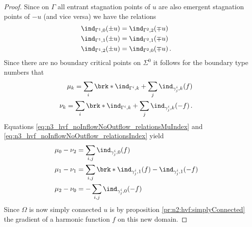 \begin{proof}
  Since on $\Gamma$ all entrant stagnation points of $u$ are also emergent
  stagnation points of $-u$ (and vice versa) we have the relations
  \begin{equation}
    \begin{aligned}
    \ind_{\Gamma^1,0}(\pm u)&=\ind_{\Gamma^2,2}(\mp u) \\
    \ind_{\Gamma^1,1}(\pm u)&=\ind_{\Gamma^2,1}(\mp u) \\
    \ind_{\Gamma^1,2}(\pm u)&=\ind_{\Gamma^2,0}(\mp u)\,.
    \end{aligned}\label{eq:n3_hvf_noInflowNoOutflow_relationsIndex}
  \end{equation}
  Since there are no boundary critical points on $\Sigma^0$ it follows for the 
  boundary type numbers that
  \begin{equation}
    \begin{aligned}
    \mu_k=\sum_i\brk*{\ind_{\Gamma^i,k}+\sum_j\ind_{\gamma_j^i,k}}(f) \\
    \nu_k=\sum_i\brk*{\ind_{\Gamma^i,k}+\sum_j\ind_{\gamma_j^i,k}}(-f)\,.
    \end{aligned}\label{eq:n3_hvf_noInflowNoOutflow_relationsMuIndex}
  \end{equation}
  Equations \eqref{eq:n3_hvf_noInflowNoOutflow_relationsMuIndex} and \eqref{eq:n3_hvf_noInflowNoOutflow_relationsIndex}
  yield
  \begin{equation}
    \begin{aligned}
    \mu_0-\nu_2&=\sum_{i,j}\ind_{\gamma_j^i,0}(f) \\
    \mu_1-\nu_1&=\sum_{i,j}\brk*{\ind_{\gamma_j^i,1}(f)-\ind_{\gamma_j^i,1}(-f)} \\
    \mu_2-\nu_0&=-\sum_{i,j}\ind_{\gamma_j^i,0}(-f)
    \end{aligned}
    \label{eq:n3_hvf_noInflowNoOutflow_relationsMuNu}
  \end{equation}
  Since $\Omega$ is now simply connected $u$ is 
  by proposition \ref{pr:n2:hvf:simplyConnected}
  the gradient of a harmonic function $f$ on this new domain.

\end{proof}
